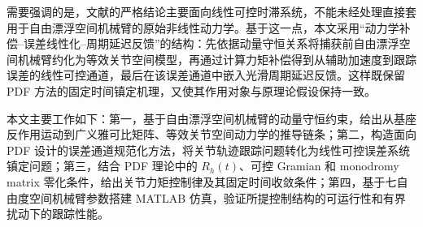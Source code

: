 需要强调的是，文献\cite{zhouFixedtimeStabilizationLinear2022}的严格结论主要面向线性可控时滞系统，不能未经处理直接套用于自由漂浮空间机械臂的原始非线性动力学。基于这一点，本文采用“动力学补偿--误差线性化--周期延迟反馈”的结构：先依据动量守恒关系将捕获前自由漂浮空间机械臂约化为等效关节空间模型，再通过计算力矩补偿得到从辅助加速度到跟踪误差的线性可控通道，最后在该误差通道中嵌入光滑周期延迟反馈。这样既保留 PDF 方法的固定时间镇定机理，又使其作用对象与原理论假设保持一致。

本文主要工作如下：第一，基于自由漂浮空间机械臂的动量守恒约束，给出从基座反作用运动到广义雅可比矩阵、等效关节空间动力学的推导链条；第二，构造面向 PDF 设计的误差通道规范化方法，将关节轨迹跟踪问题转化为线性可控误差系统镇定问题；第三，结合 PDF 理论中的 \(R_h(t)\)、可控 Gramian 和 monodromy matrix 零化条件，给出关节力矩控制律及其固定时间收敛条件；第四，基于七自由度空间机械臂参数搭建 MATLAB 仿真，验证所提控制结构的可运行性和有界扰动下的跟踪性能。
